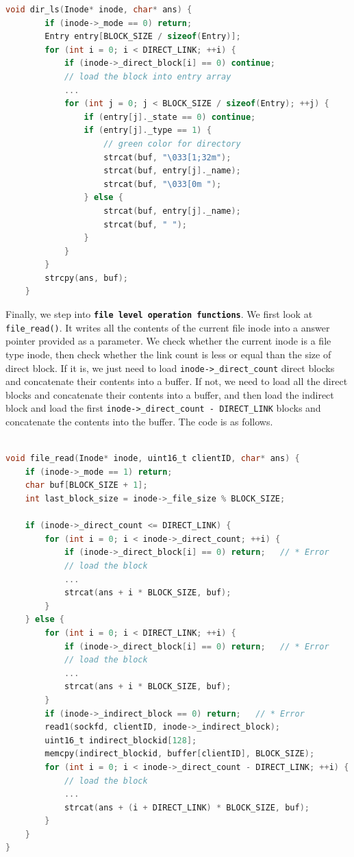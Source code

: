 \begin{lstlisting}[language=C]
    void dir_ls(Inode* inode, char* ans) {
        if (inode->_mode == 0) return;
        Entry entry[BLOCK_SIZE / sizeof(Entry)];
        for (int i = 0; i < DIRECT_LINK; ++i) {
            if (inode->_direct_block[i] == 0) continue;
            // load the block into entry array
            ...
            for (int j = 0; j < BLOCK_SIZE / sizeof(Entry); ++j) {
                if (entry[j]._state == 0) continue;
                if (entry[j]._type == 1) {
                    // green color for directory
                    strcat(buf, "\033[1;32m");
                    strcat(buf, entry[j]._name);
                    strcat(buf, "\033[0m ");
                } else {
                    strcat(buf, entry[j]._name);
                    strcat(buf, " ");
                }
            }
        }
        strcpy(ans, buf);
    }        
\end{lstlisting}

Finally, we step into \textbf{\texttt{file level operation functions}}. We first look at \texttt{file\_read()}. It writes all the contents of the current file inode
into a answer pointer provided as a parameter. We check whether the current inode is a file type inode, then check whether the link count is less or equal than the size of direct block.
If it is, we just need to load \texttt{inode->_direct_count} direct blocks and concatenate their contents into a buffer. If not, 
we need to load all the direct blocks and concatenate their contents into a buffer, and then load the indirect block and load the first \texttt{inode->_direct_count - DIRECT\_LINK} blocks and concatenate the contents into the buffer. The code is as follows.

\begin{lstlisting}[language=C]
    
void file_read(Inode* inode, uint16_t clientID, char* ans) {
    if (inode->_mode == 1) return;
    char buf[BLOCK_SIZE + 1];
    int last_block_size = inode->_file_size % BLOCK_SIZE;

    if (inode->_direct_count <= DIRECT_LINK) {
        for (int i = 0; i < inode->_direct_count; ++i) {
            if (inode->_direct_block[i] == 0) return;   // * Error
            // load the block 
            ... 
            strcat(ans + i * BLOCK_SIZE, buf);
        }
    } else {
        for (int i = 0; i < DIRECT_LINK; ++i) {
            if (inode->_direct_block[i] == 0) return;   // * Error
            // load the block
            ... 
            strcat(ans + i * BLOCK_SIZE, buf);
        }
        if (inode->_indirect_block == 0) return;   // * Error
        read1(sockfd, clientID, inode->_indirect_block);
        uint16_t indirect_blockid[128];
        memcpy(indirect_blockid, buffer[clientID], BLOCK_SIZE);
        for (int i = 0; i < inode->_direct_count - DIRECT_LINK; ++i) {
            // load the block 
            ... 
            strcat(ans + (i + DIRECT_LINK) * BLOCK_SIZE, buf);
        }
    }
}

\end{lstlisting}

